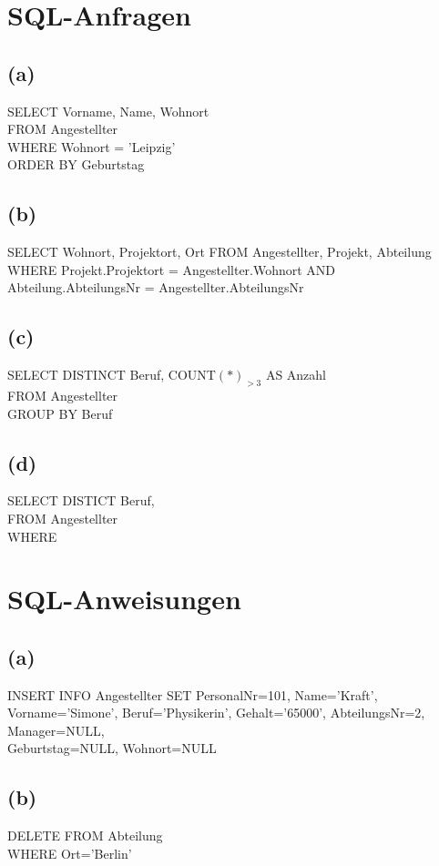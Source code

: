\documentclass{article}
\begin{document}
\section{SQL-Anfragen}
\subsection{(a)}
SELECT Vorname, Name, Wohnort\\
FROM Angestellter\\
WHERE Wohnort = 'Leipzig'\\
ORDER BY Geburtstag\\

\subsection{(b)}
SELECT Wohnort, Projektort, Ort
FROM Angestellter, Projekt, Abteilung\\
WHERE Projekt.Projektort = Angestellter.Wohnort
AND Abteilung.AbteilungsNr = Angestellter.AbteilungsNr \\
 
 
\subsection{(c)}
SELECT DISTINCT Beruf, COUNT$(*)_{>3}$ AS Anzahl\\
FROM Angestellter\\
GROUP BY Beruf\\


\subsection{(d)}
SELECT DISTICT Beruf, \\
FROM Angestellter \\
WHERE 




\section{SQL-Anweisungen}
\subsection{(a)}
INSERT INFO Angestellter 
SET PersonalNr=101, Name='Kraft', Vorname='Simone', Beruf='Physikerin', Gehalt='65000', AbteilungsNr=2,
Manager=NULL,\\ 
Geburtstag=NULL, Wohnort=NULL

\subsection{(b)}
DELETE FROM Abteilung\\
WHERE Ort='Berlin'\\
\end{document}

